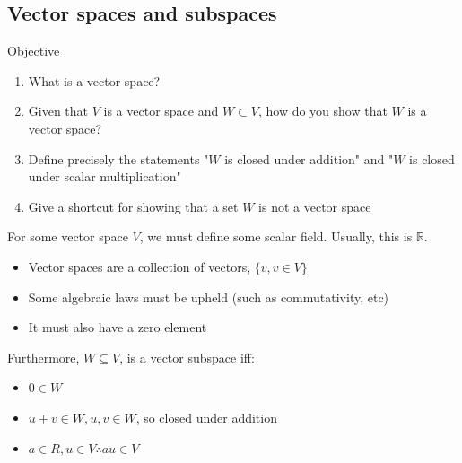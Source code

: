 \documentclass[journal, letterpaper]{IEEEtran}
\begin{document}
    \subsection{Vector spaces and subspaces}
    \begin{mybox}{Objective}
        \begin{enumerate}
            \item What is a vector space?
            \item Given that $V$ is a vector space and $W \subset V$, how do you show that $W$ is a vector space?
            \item Define precisely the statements "$W$ is closed under addition" and "$W$ is closed under scalar multiplication"
            \item Give a shortcut for showing that a set $W$ is not a vector space
        \end{enumerate}
    \end{mybox}
    For some vector space $V$, we must define some scalar field. Usually, this is $\mathbb{R}$.
    \begin{itemize}
        \item Vector spaces are a collection of vectors, $\{v, v \in V\}$
        \item Some algebraic laws must be upheld (such as commutativity, etc)
        \item It must also have a zero element
    \end{itemize}
    Furthermore, $W \subseteq V$, is a vector subspace iff:
    \begin{itemize}
        \item $0 \in W$
        \item $u + v \in W, u, v \in W$, so closed under addition
        \item $a \in R, u \in V \therefore au \in V$
    \end{itemize}
\end{document}
